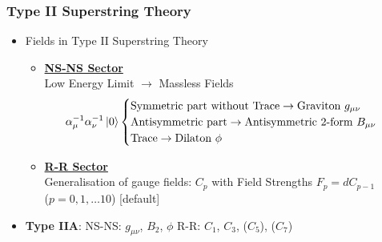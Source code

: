 \documentclass[t]{beamer}
\begin{document}
\begin{frame}
\frametitle{Type II Superstring Theory}

\begin{itemize}
\setlength{\parskip}{10pt}
\item<1-> Fields in Type II Superstring Theory

\begin{itemize}
[triangle]
\setlength{\parskip}{5pt}

\item<2-> \underline{\textbf{NS-NS Sector}}\\
\vspace{10 pt}
Low Energy Limit $\rightarrow$ Massless Fields
\vspace{10 pt}
$$ \alpha^{-1}_\mu \alpha^{-1}_\nu \Ket{0}
\begin{cases}
\text{Symmetric part without Trace} \rightarrow \text{Graviton } g_{\mu\nu}  \\
\text{Antisymmetric part} \rightarrow \text{Antisymmetric 2-form  } B_{\mu\nu} \\
\text{Trace} \rightarrow \text{Dilaton  } \phi
\end{cases}
$$

\item<3-> \underline{\textbf{R-R Sector}}\\
\vspace{10 pt}
Generalisation of gauge fields: $C_p$ with Field Strengths $F_{p} = dC_{p-1}$\\
\footnotesize{($p=0,1, \ldots 10$)}
[default]
\end{itemize}

\item<4-> \textbf{Type IIA}: \:\:\:\:\:\: NS-NS: $g_{\mu\nu}$, $B_2$, $\phi$ \:\:\:\:\:\: R-R: $C_1$, $C_3$, ($C_5$), ($C_7$)

\end{itemize}
\end{frame}

\end{document}
